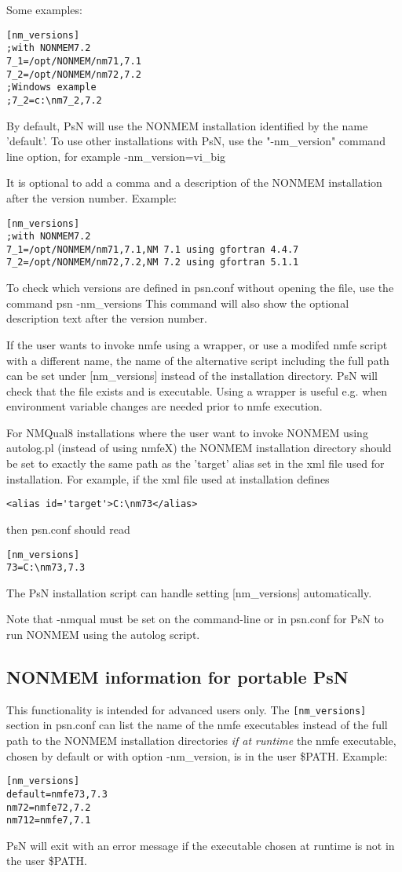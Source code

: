 Some examples:
\begin{verbatim}
[nm_versions]
;with NONMEM7.2 
7_1=/opt/NONMEM/nm71,7.1
7_2=/opt/NONMEM/nm72,7.2
;Windows example
;7_2=c:\nm7_2,7.2
\end{verbatim}
By default, PsN will use the NONMEM installation identified by the name 'default'. To use other installations with PsN, use the "-nm\_version" command line option, for example -nm\_version=vi\_big

It is optional to add a comma and a description of the NONMEM installation after
the version
number. Example:
\begin{verbatim}
[nm_versions]
;with NONMEM7.2 
7_1=/opt/NONMEM/nm71,7.1,NM 7.1 using gfortran 4.4.7
7_2=/opt/NONMEM/nm72,7.2,NM 7.2 using gfortran 5.1.1
\end{verbatim}

To check which versions are defined in psn.conf without opening the file, use the command 
psn -nm\_versions
This command will also show the optional description text after the version number.

If the user wants to invoke nmfe using a wrapper, or use a modifed nmfe script with a different name, the name of the alternative script 
including the full path can be set under [nm\_versions] instead of the installation directory. PsN will check that the file exists and is executable. 
Using a wrapper is useful e.g. when environment variable changes are needed prior to nmfe execution.

For NMQual8 installations where the user want to invoke NONMEM using autolog.pl (instead of using nmfeX) 
the NONMEM installation directory should be set to exactly the same path as the 'target' alias set in the xml file used for installation. 
For example, if the xml file used at installation defines   
\begin{verbatim}
<alias id='target'>C:\nm73</alias>
\end{verbatim}
then psn.conf should read
\begin{verbatim}
[nm_versions]
73=C:\nm73,7.3
\end{verbatim}
The PsN installation script can handle setting [nm\_versions] automatically.

Note that -nmqual must be set on the command-line or in psn.conf for PsN to run NONMEM using the autolog script.

\subsection{NONMEM information for portable PsN}
This functionality is intended for advanced users only. The
\verb|[nm_versions]|
section in psn.conf can list the name of the nmfe executables instead of
the full path to the NONMEM installation directories 
\emph{if at runtime}
the nmfe executable, chosen by default or with option -nm\_version,
is in the user \$PATH. Example:
\begin{verbatim}
[nm_versions]
default=nmfe73,7.3
nm72=nmfe72,7.2
nm712=nmfe7,7.1
\end{verbatim}
PsN will exit with an error message
if the executable chosen at runtime is not
in the user \$PATH.

